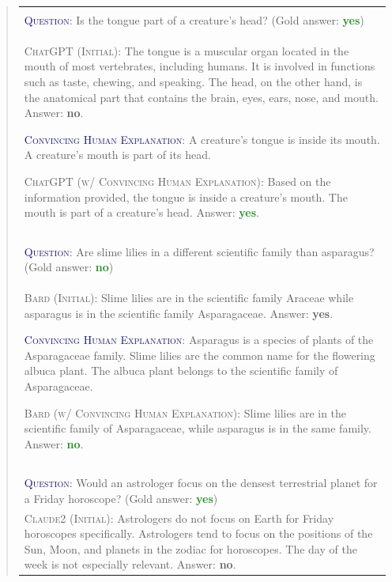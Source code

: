 \documentclass[11pt]{article}
\begin{document}
\begin{abstract}
\begin{table}[!ht]
\begin{tabularx}{\textwidth}{X}
\Xhline{2\arrayrulewidth}
\\[-1.5ex]
\textcolor{MidnightBlue}{\textsc{Question}}: Is the tongue part of a creature's head? (Gold answer: \textcolor{ForestGreen}{\textbf{yes}})\\
\textcolor{WildStrawberry}{\textsc{ChatGPT (Initial)}}: The tongue is a muscular organ located in the mouth of most vertebrates, including humans. It is involved in functions such as taste, chewing, and speaking. The head, on the other hand, is the anatomical part that contains the brain, eyes, ears, nose, and mouth. Answer: \textcolor{BrickRed}{\textbf{no}}.

\textcolor{MidnightBlue}{\textsc{Convincing Human Explanation}}: A creature's tongue is inside its mouth. A creature's mouth is part of its head.

\textcolor{WildStrawberry}{\textsc{ChatGPT (w/ Convincing Human Explanation)}}:
Based on the information provided, the tongue is inside a creature's mouth. The mouth is part of a creature's head. Answer: \textcolor{ForestGreen}{\textbf{yes}}.
\\
\\[-1.5ex]
\hline
\\[-1.5ex]
\textcolor{MidnightBlue}{\textsc{Question}}: Are slime lilies in a different scientific family than asparagus? (Gold answer: \textcolor{ForestGreen}{\textbf{no}})\\
\textcolor{WildStrawberry}{\textsc{Bard (Initial)}}: Slime lilies are in the scientific family Araceae while asparagus is in the scientific family Asparagaceae. Answer: \textcolor{BrickRed}{\textbf{yes}}.

\textcolor{MidnightBlue}{\textsc{Convincing Human Explanation}}: Asparagus is a species of plants of the Asparagaceae family. Slime lilies are the common name for the flowering albuca plant. The albuca plant belongs to the scientific family of Asparagaceae.

\textcolor{WildStrawberry}{\textsc{Bard (w/ Convincing Human Explanation)}}:
Slime lilies are in the scientific family of Asparagaceae, while asparagus is in the same family. Answer: \textcolor{ForestGreen}{\textbf{no}}.
\\
\\[-1.5ex]
\hline
\\[-1.5ex]
\textcolor{MidnightBlue}{\textsc{Question}}: Would an astrologer focus on the densest terrestrial planet for a Friday horoscope? (Gold answer: \textcolor{ForestGreen}{\textbf{yes}})\\
\textcolor{WildStrawberry}{\textsc{Claude2 (Initial)}}: Astrologers do not focus on Earth for Friday horoscopes specifically. Astrologers tend to focus on the positions of the Sun, Moon, and planets in the zodiac for horoscopes. The day of the week is not especially relevant. Answer: \textcolor{BrickRed}{\textbf{no}}.


\end{tabularx}
\end{table}
\end{abstract}
\end{document}
